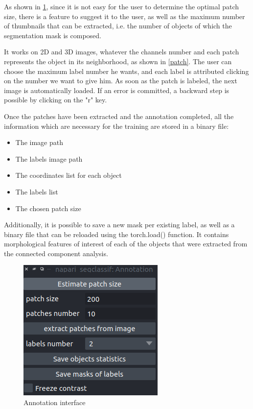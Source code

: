 \documentclass{article}
\begin{document}
As shown in \ref{labelization}, since it is not easy for the user to determine the optimal patch size, there is a feature to suggest it to the user, as well as the maximum number of thumbnails that can be extracted, i.e. the number of objects of which the segmentation mask is composed. 

It works on 2D and 3D images, whatever the channels number and each patch represents the object in its neighborhood, as shown in \ref{patch}. The user can choose the maximum label number he wants, and each label is attributed clicking on the number we want to give him. As soon as the patch is labeled, the next image is automatically loaded. If an error is committed, a backward step is possible by clicking on the "r" key.

Once the patches have been extracted and the annotation completed, all the information which are necessary for the training are stored in a binary file:
\begin{itemize}
  \item The image path 
  \item The labels image path
  \item The coordinates list for each object
  \item The labels list
  \item The chosen patch size  
\end{itemize}
Additionally, it is possible to save a new mask per existing label, as well as a binary file that can be reloaded using the torch.load() function. It contains morphological features of interest of each of the objects that were extracted from the connected component analysis.


\begin{figure}[htp!]
 \centering
 \includegraphics[scale=0.18]{Figures/annotation.png}
  \caption{Annotation interface}
  \label{labelization}

\end{figure}
\end{document}
